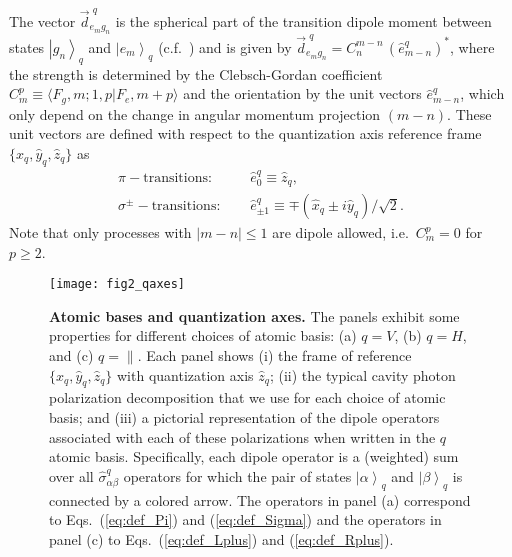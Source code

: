 \documentclass[aps,prx,superscriptaddress,twocolumn,notitlepage,nofootinbib,longbibliography]{revtex4-2}
\newcommand{\ket}[1]{\left|#1\right>}
\newcommand{\qusub}{q}
\begin{document}
The vector $\vec{d}^{\,\,\qusub}_{e_mg_n}$ is the spherical part of the transition dipole moment between states $\ket{g_n}_{\qusub}$ and $\ket{e_m}_{\qusub}$ (c.f.~\cite{Orioli_PRA101}) and is given by $\vec{d}^{\,\,\qusub}_{e_mg_n} = C^{m-n}_{n}\, (\hat{e}^{\qusub}_{m-n})^*$, where the strength is determined by the Clebsch-Gordan coefficient $C^p_m \equiv \langle F_g, m; 1,p | F_e,m+p \rangle$ and the orientation by the unit vectors $\hat{e}^{\qusub}_{m-n}$, which only depend on the change in angular momentum projection $(m-n)$. These unit vectors are defined with respect to the quantization axis reference frame $\{\hat{x}_{\qusub},\hat{y}_{\qusub},\hat{z}_{\qusub}\}$ as
\begin{align}
	\pi-\text{transitions}:&\, \quad \hat{e}^{\qusub}_0 \equiv \hat{z}_{\qusub} ,
\label{eq:pi_transitions_dipole}\\
	\sigma^\pm-\text{transitions}:&\, \quad \hat{e}^{\qusub}_{\pm1} \equiv \mp(\hat{x}_{\qusub}\pm i \hat{y}_{\qusub})/\sqrt{2} .
\label{eq:sigma_transitions_dipole}
\end{align}
Note that only processes with $|m-n|\leq1$ are dipole allowed, i.e.~$C^p_m=0$ for $p\geq2$.


\begin{figure*}[!t]
\centering
\texttt{[image: fig2\_qaxes]}
\caption{\textbf{Atomic bases and quantization axes.} The panels exhibit some properties for different choices of atomic basis: (a) $q=V$, (b) $q=H$, and (c) $q=\parallel$. Each panel shows (i) the frame of reference $\{\hat{x}_q,\hat{y}_q,\hat{z}_q\}$ with quantization axis $\hat{z}_q$; (ii) the typical cavity photon polarization decomposition that we use for each choice of atomic basis; and (iii) a pictorial representation of the dipole operators associated with each of these polarizations when written in the $q$ atomic basis. Specifically, each dipole operator is a (weighted) sum over all $\hat{\sigma}^q_{\alpha\beta}$ operators for which the pair of states $\ket{\alpha}_q$ and $\ket{\beta}_q$ is connected by a colored arrow. The operators in panel (a) correspond to Eqs.~(\ref{eq:def_Pi}) and (\ref{eq:def_Sigma}) and the operators in panel (c) to Eqs.~(\ref{eq:def_Lplus}) and (\ref{eq:def_Rplus}).}
\label{fig:qaxes}
\end{figure*}
\end{document}
